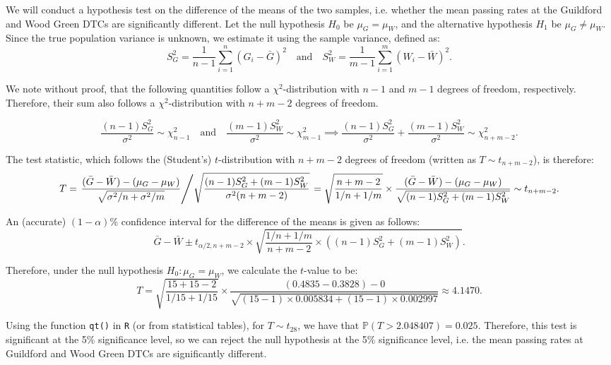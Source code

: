 \documentclass{article}
\begin{document}
We will conduct a hypothesis test on the difference of the means of the two samples, i.e. whether the mean passing rates at the Guildford and Wood Green DTCs are significantly different. Let the null hypothesis $H_0$ be $\mu_G=\mu_W$, and the alternative hypothesis $H_1$ be  $\mu_G \neq \mu_W$. Since the true population variance is unknown, we estimate it using the sample variance, defined as:
$$
S_G^2 = \frac{1}{n-1}\sum_{i=1}^n(G_i - \bar G)^2 \quad \text{and} \quad S_W^2 = \frac{1}{m-1}\sum_{i=1}^m (W_i - \bar W)^2.
$$

We note without proof, that the following quantities follow a $\chi^2$-distribution with $n-1$ and $m-1$ degrees of freedom, respectively. Therefore, their sum also follows a $\chi^2$-distribution with $n+m-2$ degrees of freedom. 

\begin{equation} \label{eq1}
    \frac{(n-1)S_G^2}{\sigma^2} \sim \chi^2_{n-1} \quad \text{and} \quad \frac{(m-1)S_W^2}{\sigma^2} \sim \chi^2_{m-1} \implies \frac{(n-1)S_G^2}{\sigma^2} + \frac{(m-1)S_W^2}{\sigma^2} \sim \chi_{n+m-2}^2.
\end{equation}

The test statistic, which follows the (Student's) $t$-distribution with $n+m-2$ degrees of freedom (written as $T \sim t_{n+m-2}$), is therefore:
$$
    T = \left.\frac{(\bar G - \bar W)-(\mu_G - \mu_W)}{\sqrt{\sigma^2/n + \sigma^2/m}} \middle/ \sqrt{\frac{(n-1)S_G^2+(m-1)S_W^2}{\sigma^2(n+m-2)}}\right. = \sqrt{\frac{n+m-2}{1/n+1/m}} \times \frac{(\bar G-\bar W)-(\mu_G-\mu_W)}{\sqrt{(n-1)S_G^2+(m-1)S_W^2}} \sim t_{n+m-2}.
$$

An (accurate) $(1-\alpha)$\% confidence interval for the difference of the means is given as follows:
$$
\bar G - \bar W \pm t_{\alpha/2, n+m-2} \times \sqrt{\frac{1/n+1/m}{n+m-2}\times((n-1)S_G^2 + (m-1)S_W^2)}.
$$

Therefore, under the null hypothesis $H_0: \mu_G=\mu_W$, we calculate the $t$-value to be:
$$
T = \sqrt{\frac{15+15-2}{1/15+1/15}} \times \frac{(0.4835 - 0.3828) - 0}{\sqrt{(15-1)\times0.005834 + (15-1)\times0.002997}} \approx 4.1470.
$$

Using the function \texttt{qt()} in \texttt{R} (or from statistical tables), for $T \sim t_{28}$, we have that $\mathbb{P}(T > 2.048407) = 0.025$. Therefore, this test is significant at the 5\% significance level, so we can reject the null hypothesis at the 5\% significance level, i.e. the mean passing rates at Guildford and Wood Green DTCs are significantly different. 
\end{document}
